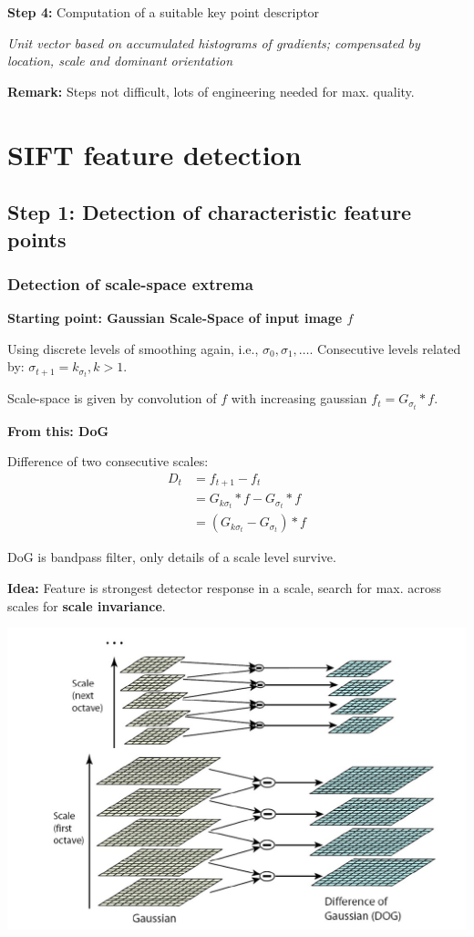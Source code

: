\textbf{Step 4:} Computation of a suitable key point descriptor

\textit{Unit vector based on accumulated histograms of gradients; compensated by location, scale and dominant orientation}

\textbf{Remark:} Steps not difficult, lots of engineering needed for max. quality.

\section{SIFT feature detection}

\subsection{Step 1: Detection of characteristic feature points}

\subsubsection{Detection of scale-space extrema}

\textbf{Starting point: Gaussian Scale-Space of input image $f$}

Using discrete levels of smoothing again, i.e., $\sigma_0, \sigma_1, \dots$. Consecutive levels related by: $\sigma_{t+1} = k_{\sigma_t}, k > 1$. 

Scale-space is given by convolution of $f$ with increasing gaussian $f_t = G_{\sigma_t} * f$. 

\textbf{From this: DoG}

Difference of two consecutive scales: \begin{align*}
    D_t & = f_{t+1} - f_t \\
    & = G_{k\sigma_t} * f - G_{\sigma_t} * f \\
    & = (G_{k\sigma_t} - G_{\sigma_t}) * f
\end{align*}

DoG is bandpass filter, only details of a scale level survive.

\textbf{Idea:} Feature is strongest detector response in a scale, search for max. across scales for \textbf{scale invariance}.

\includegraphics[width=\textwidth]{images/chap5/sift_DOG}

